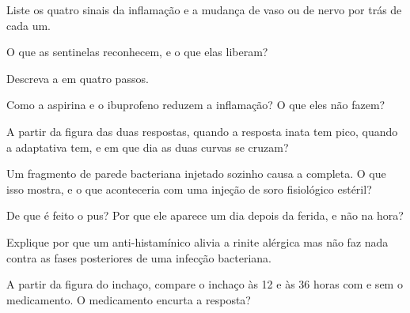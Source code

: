 \begin{exercise}[$\star$]\label{exo:g12:innate-immunity:2}
Liste os quatro sinais da inflamação e a mudança de vaso ou de nervo
por trás de cada um.
\end{exercise}

\begin{exercise}[$\star$]\label{exo:g12:innate-immunity:3}
O que as  sentinelas reconhecem, e o que elas liberam?
\end{exercise}

\begin{exercise}[$\star$]\label{exo:g12:innate-immunity:4}
Descreva a  em quatro passos.
\end{exercise}

\begin{exercise}[$\star$]\label{exo:g12:innate-immunity:5}
Como a aspirina e o ibuprofeno reduzem a inflamação? O que eles não fazem?
\end{exercise}

\begin{exercise}[$\star\star$]\label{exo:g12:innate-immunity:6}
A partir da figura das duas respostas, quando a resposta inata tem
pico, quando a adaptativa tem, e em que dia as duas curvas se cruzam?
\end{exercise}

\begin{exercise}[$\star\star$]\label{exo:g12:innate-immunity:7}
Um fragmento de parede bacteriana injetado sozinho causa a  completa. O que isso mostra, e o que aconteceria com uma
injeção de soro fisiológico estéril?
\end{exercise}

\begin{exercise}[$\star\star$]\label{exo:g12:innate-immunity:8}
De que é feito o pus? Por que ele aparece um dia depois da ferida, e
não na hora?
\end{exercise}

\begin{exercise}[$\star\star$]\label{exo:g12:innate-immunity:9}
Explique por que um anti-histamínico alivia a rinite alérgica mas não
faz nada contra as fases posteriores de uma infecção bacteriana.
\end{exercise}

\begin{exercise}[$\star\star$]\label{exo:g12:innate-immunity:10}
A partir da figura do inchaço, compare o inchaço às 12 e às 36 horas
com e sem o medicamento. O medicamento encurta a resposta?
\end{exercise}

